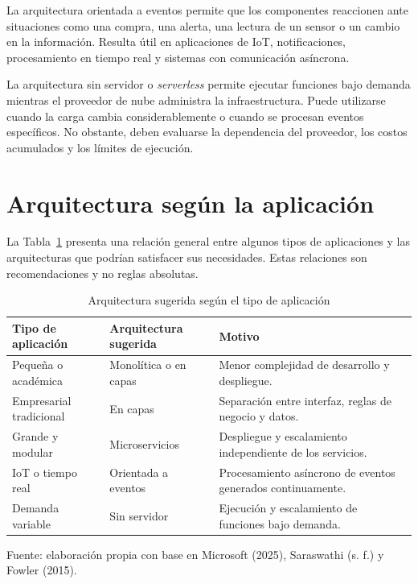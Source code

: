 \documentclass[12pt]{article}
\begin{document}
	La arquitectura orientada a eventos permite que los componentes reaccionen
	ante situaciones como una compra, una alerta, una lectura de un sensor o un
	cambio en la información. Resulta útil en aplicaciones de IoT, notificaciones,
	procesamiento en tiempo real y sistemas con comunicación asíncrona.
	
	La arquitectura sin servidor o \textit{serverless} permite ejecutar funciones
	bajo demanda mientras el proveedor de nube administra la infraestructura.
	Puede utilizarse cuando la carga cambia considerablemente o cuando se procesan
	eventos específicos. No obstante, deben evaluarse la dependencia del proveedor,
	los costos acumulados y los límites de ejecución.
	
	\section*{Arquitectura según la aplicación}
	
	La Tabla~\ref{tab:arquitecturas} presenta una relación general entre algunos
	tipos de aplicaciones y las arquitecturas que podrían satisfacer sus
	necesidades. Estas relaciones son recomendaciones y no reglas absolutas.
	
	\begin{table}[H]
		\centering
		\caption{Arquitectura sugerida según el tipo de aplicación}
		\label{tab:arquitecturas}
		\small
		\renewcommand{\arraystretch}{1.20}
		
		\begin{tabularx}{\textwidth}{
				>{\raggedright\arraybackslash}p{3.2cm}
				>{\raggedright\arraybackslash}p{3.4cm}
				>{\raggedright\arraybackslash}X
			}
			\toprule
			\textbf{Tipo de aplicación} &
			\textbf{Arquitectura sugerida} &
			\textbf{Motivo} \\
			\midrule
			
			Pequeña o académica &
			Monolítica o en capas &
			Menor complejidad de desarrollo y despliegue. \\
			
			Empresarial tradicional &
			En capas &
			Separación entre interfaz, reglas de negocio y datos. \\
			
			Grande y modular &
			Microservicios &
			Despliegue y escalamiento independiente de los servicios. \\
			
			IoT o tiempo real &
			Orientada a eventos &
			Procesamiento asíncrono de eventos generados continuamente. \\
			
			Demanda variable &
			Sin servidor &
			Ejecución y escalamiento de funciones bajo demanda. \\
			
			\bottomrule
		\end{tabularx}
		
		\begin{flushleft}
			\footnotesize
			Fuente: elaboración propia con base en Microsoft (2025),
			Saraswathi (s. f.) y Fowler (2015).
		\end{flushleft}
	\end{table}
	
\end{document}
